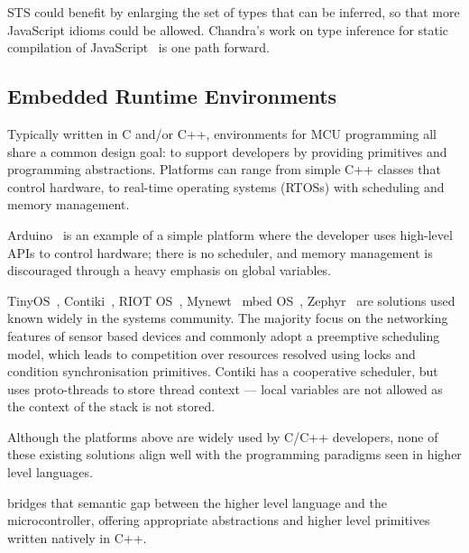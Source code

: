 STS could benefit by enlarging the set of types
that can be inferred, so that more JavaScript idioms could be allowed.
Chandra's work on type inference for static compilation of
JavaScript~\cite{ChandraOOPSLA2016} is one path forward.

\subsection{Embedded Runtime Environments}

Typically written in C and/or C++, environments for MCU programming all share
a common design goal: to support developers by providing primitives and programming
abstractions. Platforms can range from simple C++ classes that control hardware,
to real-time operating systems (RTOSs) with scheduling and memory management.

Arduino~\cite{buildingArduino2014} is an example of a simple platform where the developer uses
high-level APIs to control hardware; there is no scheduler, and memory management
is discouraged through a heavy emphasis on global variables.

TinyOS~\cite{levis2005tinyos}, Contiki~\cite{dunkels2012contiki}, RIOT OS~\cite{baccelli2013riot}, Mynewt~\cite{ApacheMy53:online} mbed OS~\cite{ARMmbed}, Zephyr~\cite{HomeZeph63:online} are solutions used known widely in the systems community. The majority focus on the networking features of sensor based devices and commonly adopt a preemptive scheduling model, which leads to competition over resources resolved using locks and condition synchronisation primitives. Contiki has a cooperative scheduler, but uses proto-threads to store thread context --- local variables are not allowed as the context of the stack is not stored.

Although the platforms above are widely used by C/C++ developers, none of these existing solutions align well with the programming paradigms seen in higher level languages.

\CO bridges that semantic gap between the higher level language and the microcontroller, offering appropriate abstractions and higher level primitives written natively in C++.

